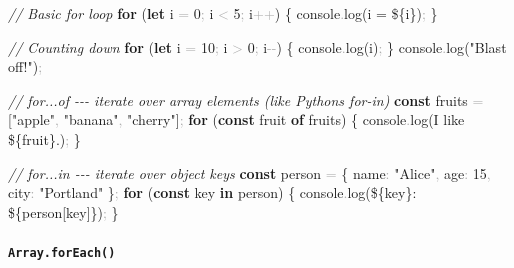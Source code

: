 \documentclass[
  justified,
  openright,
]{tufte-book}
\let\subsection\paragraph
\let\paragraph\paragraph
\newcommand{\KeywordTok}[1]{\textcolor{CodeKeyword}{\textbf{#1}}}  %
\newcommand{\StringTok}[1]{\textcolor{CodeString}{#1}}              %
\newcommand{\CommentTok}[1]{\textcolor{CodeComment}{\textit{#1}}}  %
\newcommand{\CodeNumTok}[1]{\textcolor{CodeNumber}{#1}}             %
\newcommand{\CodeFuncTok}[1]{\textcolor{CodeKeyword}{#1}}           %
\newcommand{\CodeTypeTok}[1]{\textcolor{CodeType}{#1}}              %
\newcommand{\OperatorTok}[1]{\textcolor{DarkGray}{#1}}              %
\newenvironment{Shaded}{%
  \begin{mdframed}[style=TufteCode]%
}{%
  \end{mdframed}%
}
\let\subsection\paragraph
\let\paragraph\paragraph
\begin{document}
\begin{Shaded}
\begin{Highlighting}[]
\CommentTok{// Basic for loop}
\KeywordTok{for} (\KeywordTok{let} i \OperatorTok{=} \CodeNumTok{0}\OperatorTok{;} i \OperatorTok{\textless{}} \CodeNumTok{5}\OperatorTok{;} i\OperatorTok{++}) \{
  console\OperatorTok{.}\CodeFuncTok{log}(\StringTok{\textasciigrave{}i = }\StringTok{\$\{}i\StringTok{\}}\StringTok{\textasciigrave{}})\OperatorTok{;}
\}
 
\CommentTok{// Counting down}
\KeywordTok{for} (\KeywordTok{let} i \OperatorTok{=} \CodeNumTok{10}\OperatorTok{;} i \OperatorTok{\textgreater{}} \CodeNumTok{0}\OperatorTok{;} i\OperatorTok{{-}{-}}) \{
  console\OperatorTok{.}\CodeFuncTok{log}(i)\OperatorTok{;}
\}
console\OperatorTok{.}\CodeFuncTok{log}(\StringTok{"Blast off!"})\OperatorTok{;}
 
\CommentTok{// for...of {-}{-}{-} iterate over array elements (like Python\textquotesingle{}s for{-}in)}
\KeywordTok{const} fruits \OperatorTok{=} [\StringTok{"apple"}\OperatorTok{,} \StringTok{"banana"}\OperatorTok{,} \StringTok{"cherry"}]\OperatorTok{;}
\KeywordTok{for} (\KeywordTok{const} fruit \KeywordTok{of} fruits) \{
  console\OperatorTok{.}\CodeFuncTok{log}(\StringTok{\textasciigrave{}I like }\StringTok{\$\{}fruit\StringTok{\}}\StringTok{.\textasciigrave{}})\OperatorTok{;}
\}
 
\CommentTok{// for...in {-}{-}{-} iterate over object keys}
\KeywordTok{const} person \OperatorTok{=} \{ \CodeTypeTok{name}\OperatorTok{:} \StringTok{"Alice"}\OperatorTok{,} \CodeTypeTok{age}\OperatorTok{:} \CodeNumTok{15}\OperatorTok{,} \CodeTypeTok{city}\OperatorTok{:} \StringTok{"Portland"} \}\OperatorTok{;}
\KeywordTok{for} (\KeywordTok{const} key \KeywordTok{in} person) \{
  console\OperatorTok{.}\CodeFuncTok{log}(\StringTok{\textasciigrave{}}\StringTok{\$\{}key\StringTok{\}}\StringTok{: }\StringTok{\$\{}person[key]\StringTok{\}}\StringTok{\textasciigrave{}})\OperatorTok{;}
\}
\end{Highlighting}
\end{Shaded}

\subsection{\texorpdfstring{\texttt{Array.forEach()}}{Array.forEach()}}\label{array.foreach}
\end{document}
